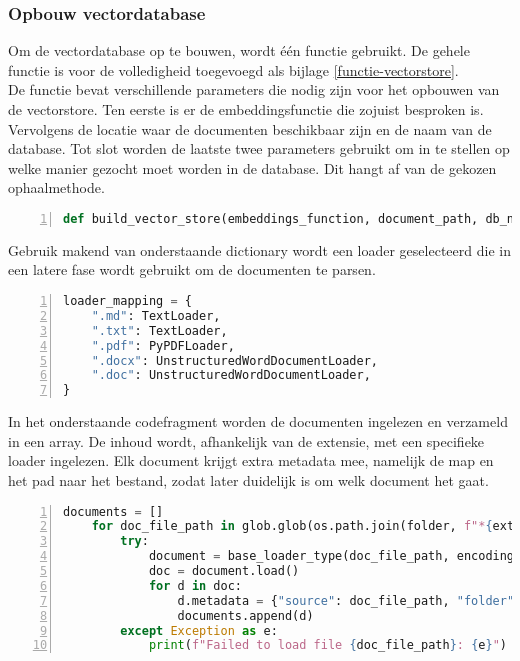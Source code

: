 \subsubsection{Opbouw vectordatabase}
Om de vectordatabase op te bouwen, wordt één functie gebruikt. De gehele functie is voor de volledigheid toegevoegd als bijlage \ref{functie-vectorstore}.
\\[1em]
De functie bevat verschillende parameters die nodig zijn voor het opbouwen van de vectorstore. Ten eerste is er de embeddingsfunctie die zojuist besproken is. Vervolgens de locatie waar de documenten beschikbaar zijn en de naam van de database. Tot slot worden de laatste twee parameters gebruikt om in te stellen op welke manier gezocht moet worden in de database. Dit hangt af van de gekozen ophaalmethode.

\begin{lstlisting}[basicstyle=\small, frame=single, breaklines=true, postbreak=\mbox{\textcolor{red}{$\hookrightarrow$}\space}, escapeinside ={\%,}, escapechar={!},
    numbers=left, language=Python, caption=Functie met parameters]
def build_vector_store(embeddings_function, document_path, db_name, search_type, search_kwargs):
\end{lstlisting}

Gebruik makend van onderstaande dictionary wordt een loader geselecteerd die in een latere fase wordt gebruikt om de documenten te parsen.

\begin{lstlisting}[basicstyle=\small, frame=single, breaklines=true, postbreak=\mbox{\textcolor{red}{$\hookrightarrow$}\space}, escapeinside ={\%,}, escapechar={!},
    numbers=left, language=Python, caption=Mapping van bestandsextensies naar de bijbehorende document loaders]
loader_mapping = {
    ".md": TextLoader,
    ".txt": TextLoader,
    ".pdf": PyPDFLoader,
    ".docx": UnstructuredWordDocumentLoader,
    ".doc": UnstructuredWordDocumentLoader,
}
\end{lstlisting}

In het onderstaande codefragment worden de documenten ingelezen en verzameld in een array. De inhoud wordt, afhankelijk van de extensie, met een specifieke loader ingelezen. Elk document krijgt extra metadata mee, namelijk de map en het pad naar het bestand, zodat later duidelijk is om welk document het gaat.

\begin{lstlisting}[basicstyle=\small, frame=single, breaklines=true, postbreak=\mbox{\textcolor{red}{$\hookrightarrow$}\space}, escapeinside ={\%,}, escapechar={!},
    numbers=left, language=Python, caption=Inladen en parsen van documenten per bestandstype met toevoeging van metadata]
    documents = []
    for doc_file_path in glob.glob(os.path.join(folder, f"*{ext}")):
        try:
            document = base_loader_type(doc_file_path, encoding="utf-8")
            doc = document.load()
            for d in doc:
                d.metadata = {"source": doc_file_path, "folder": folder}
                documents.append(d)
        except Exception as e:
            print(f"Failed to load file {doc_file_path}: {e}")
\end{lstlisting}

